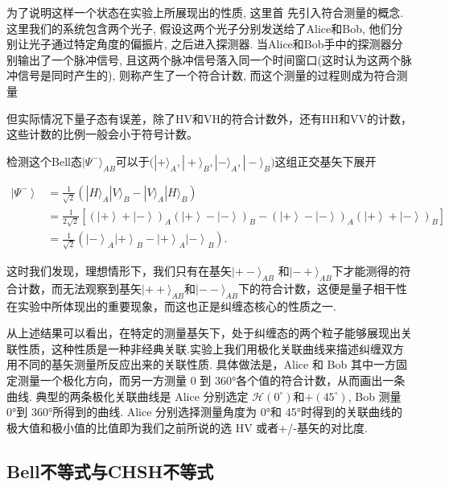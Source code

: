 \documentclass[a4paper,UTF8]{ctexart}
\begin{document}
为了说明这样一个状态在实验上所展现出的性质, 这里首  先引入符合测量的概念. 这里我们的系统包含两个光子, 假设这两个光子分别发送给了Alice和Bob, 他们分别让光子通过特定角度的偏振片, 之后进入探测器. 当Alice和Bob手中的探测器分别输出了一个脉冲信号, 且这两个脉冲信号落入同一个时间窗口(这时认为这两个脉冲信号是同时产生的), 则称产生了一个符合计数, 而这个测量的过程则成为符合测量

但实际情况下量子态有误差，除了HV和VH的符合计数外，还有HH和VV的计数，这些计数的比例一般会小于符号计数。

检测这个Bell态$|\Psi^-\rangle_{AB}$可以于$\big( |+\rangle_{A},|+\rangle_{B},|-\rangle_{A},|-\rangle_{B}\big)$这组正交基矢下展开

\begin{equation}\begin{aligned}
\left|\Psi^{-}\right\rangle & =\frac{1}{\sqrt{2}}\left(|H\rangle_{A}|V\rangle_{B}-|V\rangle_{A}|H\rangle_{B}\right) \\
&=\frac{1}{2\sqrt{2}}\left[\left(\left|+\right\rangle+\left|-\right\rangle\right)_{A}\left(\left|+\right\rangle-\left|-\right\rangle\right)_{B}-\left(\left|+\right\rangle-\left|-\right\rangle\right)_{A}\left(\left|+\right\rangle+\left|-\right\rangle\right)_{B}\right] \\
&=\frac{1}{\sqrt{2}}\left(\left|-\right\rangle_{A}\left|+\right\rangle_{B}-\left|+\right\rangle_{A}\left|-\right\rangle_{B}\right).
\end{aligned}\end{equation}

 这时我们发现，理想情形下，我们只有在基矢$|+-\rangle_{AB}$ 和$|-+\rangle_{AB}$下才能测得的符合计数，而无法观察到基矢$|++\rangle_{AB}$和$|--\rangle_{AB}$下的符合计数，这便是量子相干性在实验中所体现出的重要现象，而这也正是纠缠态核心的性质之一.

从上述结果可以看出，在特定的测量基矢下，处于纠缠态的两个粒子能够展现出关联性质，这种性质是一种非经典关联.实验上我们用极化关联曲线来描述纠缠双方用不同的基矢测量所反应出来的关联性质. 具体做法是，Alice 和 Bob 其中一方固定测量一个极化方向，而另一方测量 0 到 360°各个值的符合计数，从而画出一条曲线. 典型的两条极化关联曲线是 Alice 分别选定 $\mathcal{H}(0^\circ)$和$+(45^\circ)$, Bob 测量 0°到 360°所得到的曲线. Alice 分别选择测量角度为 0°和 45°时得到的关联曲线的极大值和极小值的比值即为我们之前所说的选 HV 或者+/-基矢的对比度.

\subsection{Bell不等式与CHSH不等式}
\end{document}
